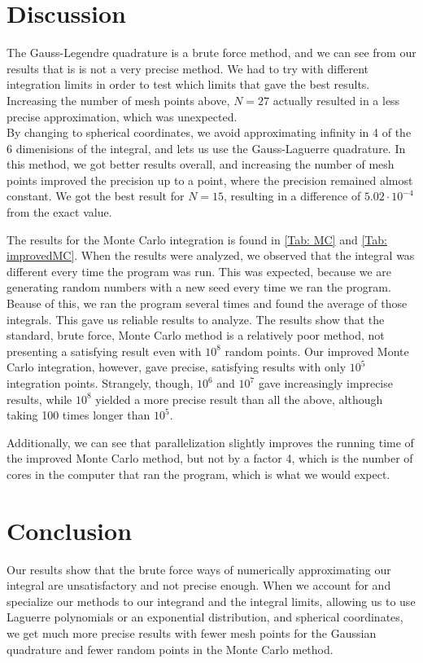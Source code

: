 \documentclass{article}
\begin{document}
\section*{Discussion}
	The Gauss-Legendre quadrature is a brute force method, and we can see from our results that is is not a very precise method. We had to try with different integration limits in order to test which limits that gave the best results. Increasing the number of mesh points above, $N = 27$ actually resulted in a less precise approximation, which was unexpected.\\

	By changing to spherical coordinates, we avoid approximating infinity in 4 of the 6 dimenisions of the integral, and lets us use the Gauss-Laguerre quadrature. In this method, we got better results overall, and increasing the number of mesh points improved the precision up to a point, where the precision remained almost constant. We got the best result for $N=15$, resulting in a difference of $5.02\cdot10^{-4}$ from the exact value.

	The results for the Monte Carlo integration is found in \ref{Tab: MC} and \ref{Tab: improvedMC}. When the results were analyzed, we observed that the integral was different every time the program was run. This was expected, because we are generating random numbers with a new seed every time we ran the program. Beause of this, we ran the program several times and found the average of those integrals. This gave us reliable results to analyze.
	The results show that the standard, brute force, Monte Carlo method is a relatively poor method, not presenting a satisfying result even with $10^8$ random points. Our improved Monte Carlo integration, however, gave precise, satisfying results with only $10^5$ integration points. Strangely, though, $10^6$ and $10^7$ gave increasingly imprecise results, while $10^8$ yielded a more precise result than all the above, although taking 100 times longer than $10^5$.

	Additionally, we can see that parallelization slightly improves the running time of the improved Monte Carlo method, but not by a factor 4, which is the number of cores in the computer that ran the program, which is what we would expect.

\section*{Conclusion}
	Our results show that the brute force ways of numerically approximating our integral are unsatisfactory and not precise enough. When we account for and specialize our methods to our integrand and the integral limits, allowing us to use Laguerre polynomials or an exponential distribution, and spherical coordinates, we get much more precise results with fewer mesh points for the Gaussian quadrature and fewer random points in the Monte Carlo method.
\end{document}
